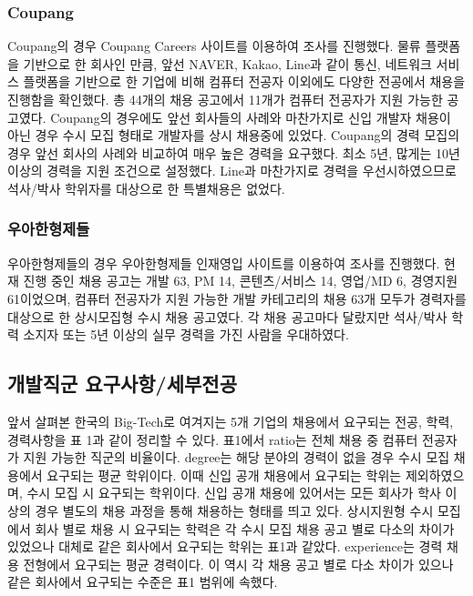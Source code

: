 \documentclass{pnu-survey}
\begin{document}
\subsubsection{Coupang}
Coupang의 경우 Coupang Careers 사이트를 이용하여 조사를 진행했다. 물류 플랫폼을 기반으로 한 회사인 만큼, 앞선 NAVER, Kakao, Line과 같이 통신, 네트워크 서비스 플랫폼을 기반으로 한 기업에 비해 컴퓨터 전공자 이외에도 다양한 전공에서 채용을 진행함을 확인했다. 총 44개의 채용 공고에서 11개가 컴퓨터 전공자가 지원 가능한 공고였다. Coupang의 경우에도 앞선 회사들의 사례와 마찬가지로 신입 개발자 채용이 아닌 경우 수시 모집 형태로 개발자를 상시 채용중에 있었다. Coupang의 경력 모집의 경우 앞선 회사의 사례와 비교하여 매우 높은 경력을 요구했다. 최소 5년, 많게는 10년 이상의 경력을 지원 조건으로 설정했다. Line과 마찬가지로 경력을 우선시하였으므로 석사/박사 학위자를 대상으로 한 특별채용은 없었다.

\subsubsection{우아한형제들}
우아한형제들의 경우 우아한형제들 인재영입 사이트를 이용하여 조사를 진행했다. 현재 진행 중인 채용 공고는 개발 63, PM 14, 콘텐츠/서비스 14, 영업/MD 6, 경영지원 61이었으며, 컴퓨터 전공자가 지원 가능한 개발 카테고리의 채용 63개 모두가 경력자를 대상으로 한 상시모집형 수시 채용 공고였다. 각 채용 공고마다 달랐지만 석사/박사 학력 소지자 또는 5년 이상의 실무 경력을 가진 사람을 우대하였다. 

\subsection{개발직군 요구사항/세부전공}

앞서 살펴본 한국의 Big-Tech로 여겨지는 5개 기업의 채용에서 요구되는 전공, 학력, 경력사항을 표 1과 같이 정리할 수 있다. 표1에서 ratio는 전체 채용 중 컴퓨터 전공자가 지원 가능한 직군의 비율이다. degree는 해당 분야의 경력이 없을 경우 수시 모집 채용에서 요구되는 평균 학위이다. 이때 신입 공개 채용에서 요구되는 학위는 제외하였으며, 수시 모집 시 요구되는 학위이다. 신입 공개 채용에 있어서는 모든 회사가 학사 이상의 경우 별도의 채용 과정을 통해 채용하는 형태를 띄고 있다. 상시지원형 수시 모집에서 회사 별로 채용 시 요구되는 학력은 각 수시 모집 채용 공고 별로 다소의 차이가 있었으나 대체로 같은 회사에서 요구되는 학위는 표1과 같았다. experience는 경력 채용 전형에서 요구되는 평균 경력이다. 이 역시 각 채용 공고 별로 다소 차이가 있으나 같은 회사에서 요구되는 수준은 표1 범위에 속했다.
\end{document}
